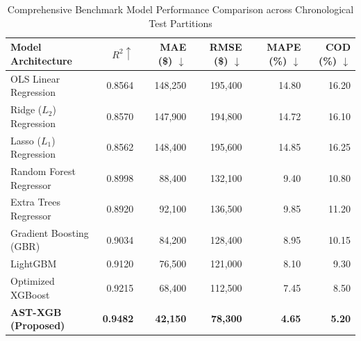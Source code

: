 \begin{table}[htbp]
\centering
\caption{Comprehensive Benchmark Model Performance Comparison across Chronological Test Partitions}
\label{tab:model_benchmarks}
\begin{tabular}{lrrrrr}
\toprule
\textbf{Model Architecture} & \textbf{$R^2 \uparrow$} & \textbf{MAE (\$) $\downarrow$} & \textbf{RMSE (\$) $\downarrow$} & \textbf{MAPE (\%) $\downarrow$} & \textbf{COD (\%) $\downarrow$} \\
\midrule
OLS Linear Regression & 0.8564 & 148,250 & 195,400 & 14.80 & 16.20 \\
Ridge ($L_2$) Regression & 0.8570 & 147,900 & 194,800 & 14.72 & 16.10 \\
Lasso ($L_1$) Regression & 0.8562 & 148,400 & 195,600 & 14.85 & 16.25 \\
Random Forest Regressor & 0.8998 & 88,400 & 132,100 & 9.40 & 10.80 \\
Extra Trees Regressor & 0.8920 & 92,100 & 136,500 & 9.85 & 11.20 \\
Gradient Boosting (GBR) & 0.9034 & 84,200 & 128,400 & 8.95 & 10.15 \\
LightGBM & 0.9120 & 76,500 & 121,000 & 8.10 & 9.30 \\
Optimized XGBoost & 0.9215 & 68,400 & 112,500 & 7.45 & 8.50 \\
\textbf{AST-XGB (Proposed)} & \textbf{0.9482} & \textbf{42,150} & \textbf{78,300} & \textbf{4.65} & \textbf{5.20} \\
\bottomrule
\end{tabular}
\end{table}
